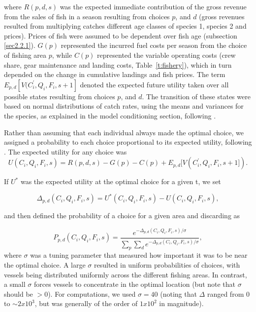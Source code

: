 \documentclass[12pt,oneline,a4paper,numbib]{ouparticle}
\numberwithin{equation}{subsection} %
\begin{document}
where $R(p, d, s)$ was the expected immediate contribution of the gross revenue from the sales of fish in a season resulting from choices $p$, and $d$ (gross revenues resulted from multiplying catches different age classes of species 1, species 2 and prices). Prices of fish were assumed to be dependent over fish age (subsection \ref{sec2.2.1}). $G(p)$ represented the incurred fuel costs per season from the choice of fishing area $p$, while  $ C(p)$ represented the variable operating costs (crew share, gear maintenance and landing costs, Table~\ref{t:fishery}), which in turn depended on the change in cumulative landings and fish prices. The term $E_{p, d}[V (C_i^\prime, Q_i, F_i, s+1]$ denoted the expected future utility taken over all possible states resulting from choices $p$, and $d$. The transition of these states were based on normal distributions of catch rates, using the means and variances for the species, as explained in the model conditioning section, following \cite{Poos2010}.

Rather than assuming that each individual always made the optimal choice, we assigned a probability to each choice proportional to its expected utility, following \cite{Dowling2011}. The expected utility for any choice was
\begin{equation}
U (C_i, Q_i, F_i, s) = R(p, d, s)- G(p) - C(p) + E_{p, d}[V (C_i^\prime, Q_i, F_i, s+1]).
\end{equation}

If $U^*$ was the expected utility at the optimal choice for a given t, we set

\begin{equation}
\Delta_{p, d}(C_i, Q_i, F_i, s) =  U^* (C_i, Q_i, F_i, s) - U (C_i, Q_i, F_i, s),
\end{equation}

and then defined the probability of a choice for a given area and discarding as	

\begin{equation} \label{eq:solve}
P_{p, d}(C_i, Q_i, F_i, s) = \frac
                {e^{ -\Delta_{p, d}(C_i, Q_i, F_i, s)/\sigma}}
                {\sum_p \sum_d e^{ -\Delta_{p, d}(C_i, Q_i, F_i, s)/\sigma}},
\end{equation}
where $\sigma$ was a tuning parameter that measured how important it was to be near the optimal choice. A large $\sigma$ resulted in uniform probabilities of choices, with vessels being distributed uniformly across the different fishing areas. In contrast, a small $\sigma$ forces vessels to concentrate in the optimal location (but note that $\sigma$ should be $> 0$). For computations, we used $\sigma = 40$ (noting that $\Delta$ ranged from 0 to $\sim 2 x 10^{3}$, but was generally of the order of $1 x 10^2$ in magnitude).
\end{document}
